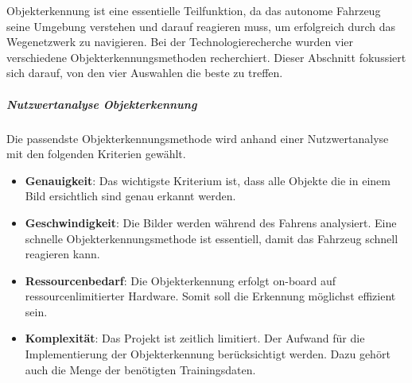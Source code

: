 Objekterkennung ist eine essentielle Teilfunktion, da das autonome Fahrzeug seine Umgebung verstehen und darauf reagieren muss, um erfolgreich durch das Wegenetzwerk zu navigieren.
Bei der Technologierecherche wurden vier verschiedene Objekterkennungsmethoden recherchiert.
Dieser Abschnitt fokussiert sich darauf, von den vier Auswahlen die beste zu treffen.

\subparagraph{Nutzwertanalyse Objekterkennung}

Die passendste Objekterkennungsmethode wird anhand einer Nutzwertanalyse mit den folgenden Kriterien gewählt.

\begin{itemize}
\item \textbf{Genauigkeit}: Das wichtigste Kriterium ist, dass alle Objekte die in einem Bild ersichtlich sind genau erkannt werden.
\item \textbf{Geschwindigkeit}: Die Bilder werden während des Fahrens analysiert. Eine schnelle Objekterkennungsmethode ist essentiell, damit das Fahrzeug schnell reagieren kann.
\item \textbf{Ressourcenbedarf}: Die Objekterkennung erfolgt on-board auf ressourcenlimitierter Hardware. Somit soll die Erkennung möglichst effizient sein.
\item \textbf{Komplexität}: Das Projekt ist zeitlich limitiert. Der Aufwand für die Implementierung der Objekterkennung berücksichtigt werden. Dazu gehört auch die Menge der benötigten Trainingsdaten.
\end{itemize}


